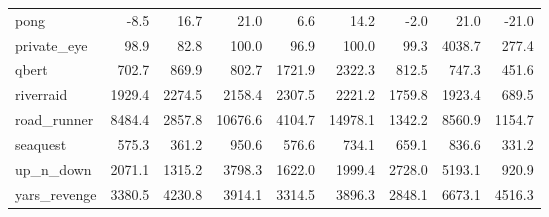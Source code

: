 \documentclass{article} %
\begin{document}
\begin{tabular}{lrrrrrrrr}
pong            &       -8.5 &            16.7 &     21.0 &          6.6 &         14.2 &          -2.0 &         21.0 &      -21.0 \\
private\_eye     &       98.9 &            82.8 &    100.0 &         96.9 &        100.0 &          99.3 &       4038.7 &      277.4 \\
qbert           &      702.7 &           869.9 &    802.7 &       1721.9 &       2322.3 &         812.5 &        747.3 &      451.6 \\
riverraid       &     1929.4 &          2274.5 &   2158.4 &       2307.5 &       2221.2 &        1759.8 &       1923.4 &      689.5 \\
road\_runner     &     8484.4 &          2857.8 &  10676.6 &       4104.7 &      14978.1 &        1342.2 &       8560.9 &     1154.7 \\
seaquest        &      575.3 &           361.2 &    950.6 &        576.6 &        734.1 &         659.1 &        836.6 &      331.2 \\
up\_n\_down       &     2071.1 &          1315.2 &   3798.3 &       1622.0 &       1999.4 &        2728.0 &       5193.1 &      920.9 \\
yars\_revenge    &     3380.5 &          4230.8 &   3914.1 &       3314.5 &       3896.3 &        2848.1 &       6673.1 &     4516.3 \\
\bottomrule
\end{tabular}
\end{document}
